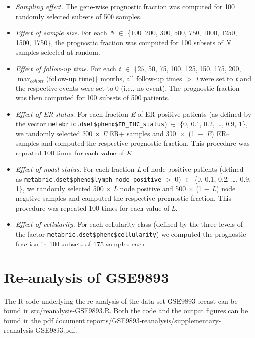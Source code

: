 \begin{itemize}
\item \emph{Sampling effect.}  The gene-wise prognostic fraction was computed
  for 100 randomly selected subsets of 500 samples.
\item \emph{Effect of sample size.}  For each \emph{N} $\in$ \{100, 200, 300,
  500, 750, 1000, 1250, 1500, 1750\}, the prognostic fraction was computed for
  100 subsets of \emph{N} samples selected at random.
\item \emph{Effect of follow-up time.}  For each \emph{t} $\in$ \{25, 50, 75,
  100, 125, 150, 175, 200, $\max_{cohort}$(follow-up time)\} months, all
  follow-up times $>$ \emph{t} were set to \emph{t} and the respective events
  were set to 0 (i.e., no event).  The prognostic fraction was then computed for
  100 subsets of 500 patients.
\item \emph{Effect of ER status.}  For each fraction \emph{E} of ER positive
  patients (as defined by the vector
  \texttt{metabric.dset\$pheno\$ER\_IHC\_status}) $\in$ \{0, 0.1, 0.2, \ldots{},
  0.9, 1\}, we randomly selected 300 $\times$ \emph{E} ER+ samples and \mbox{300
    $\times$ (1 $-$ \emph{E})} ER-- samples and computed the respective
  prognostic fraction.  This procedure was repeated 100 times for each value of
  \emph{E}.
\item \emph{Effect of nodal status.}  For each fraction \emph{L} of node
  positive patients (defined as
  \texttt{metabric.dset\$pheno\$lymph\_node\_positive} $>$ 0) $\in$ \{0, 0.1,
  0.2, \ldots{}, 0.9, 1\}, we randomly selected 500 $\times$ \emph{L} node
  positive and 500 $\times$ (1 $-$ \emph{L}) node negative samples and computed
  the respective prognostic fraction.  This procedure was repeated 100 times for
  each value of \emph{L}.
\item \emph{Effect of cellularity.}  For each cellularity class (defined by the
  three levels of the factor \texttt{metabric.dset\$pheno\$cellularity}) we
  computed the prognostic fraction in 100 subsets of 175 samples each.
\end{itemize}

\section{Re-analysis of GSE9893}
The \textsf{R} code underlying the re-analysis of the data-set
\textsf{GSE9893-breast} can be found in \textsf{src/reanalysis-GSE9893.R}.  Both
the code and the output figures can be found in the pdf document
\textsf{reports/GSE9893-reanalysis/supplementary-reanalysis-GSE9893.pdf}.

